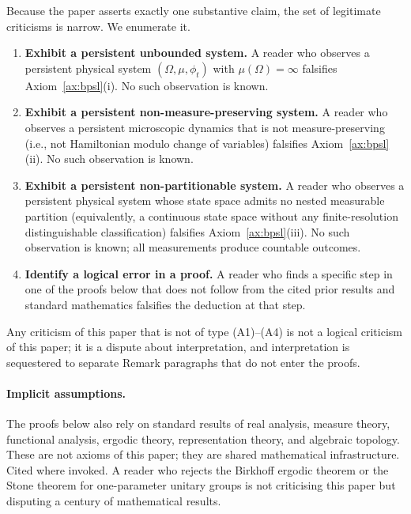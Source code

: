 Because the paper asserts exactly one substantive claim, the set of legitimate criticisms is narrow. We enumerate it.

\begin{enumerate}[label=(A\arabic*)]
  \item\label{at:unbounded} \textbf{Exhibit a persistent unbounded system.} A reader who observes a persistent physical system $(\Omega,\mu,\phi_{t})$ with $\mu(\Omega)=\infty$ falsifies Axiom~\ref{ax:bpsl}(i). No such observation is known.
  \item\label{at:nonliouville} \textbf{Exhibit a persistent non-measure-preserving system.} A reader who observes a persistent microscopic dynamics that is not measure-preserving (i.e., not Hamiltonian modulo change of variables) falsifies Axiom~\ref{ax:bpsl}(ii). No such observation is known.
  \item\label{at:nonpartition} \textbf{Exhibit a persistent non-partitionable system.} A reader who observes a persistent physical system whose state space admits no nested measurable partition (equivalently, a continuous state space without any finite-resolution distinguishable classification) falsifies Axiom~\ref{ax:bpsl}(iii). No such observation is known; all measurements produce countable outcomes.
  \item\label{at:proof} \textbf{Identify a logical error in a proof.} A reader who finds a specific step in one of the proofs below that does not follow from the cited prior results and standard mathematics falsifies the deduction at that step.
\end{enumerate}

Any criticism of this paper that is not of type (A1)--(A4) is not a logical criticism of this paper; it is a dispute about interpretation, and interpretation is sequestered to separate Remark paragraphs that do not enter the proofs.

\paragraph{Implicit assumptions.} The proofs below also rely on standard results of real analysis, measure theory, functional analysis, ergodic theory, representation theory, and algebraic topology. These are not axioms of this paper; they are shared mathematical infrastructure. Cited where invoked. A reader who rejects the Birkhoff ergodic theorem or the Stone theorem for one-parameter unitary groups is not criticising this paper but disputing a century of mathematical results.

